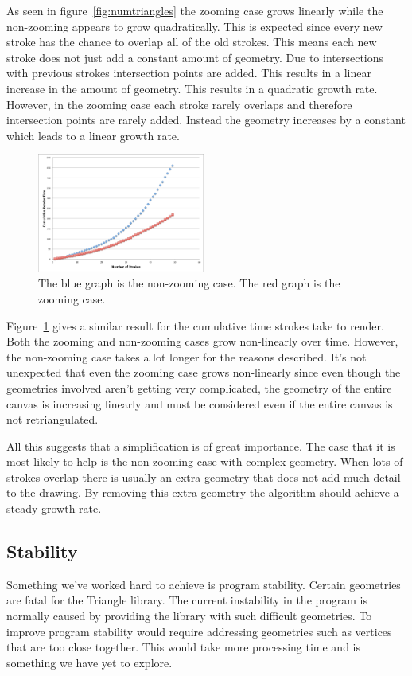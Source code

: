 \documentclass[conference]{acmsiggraph}
\begin{document}
As seen in figure~\ref{fig:numtriangles} the zooming case grows linearly while the non-zooming
appears to grow quadratically. This is expected since every new stroke has the chance to overlap
all of the old strokes. This means each new stroke does not just add a constant amount of geometry.
Due to intersections with previous strokes intersection points are added. This results in a linear
increase in the amount of geometry. This results
in a quadratic growth rate. However, in the zooming case each stroke rarely overlaps and therefore
intersection points are rarely added. Instead the geometry increases by a constant which leads to
a linear growth rate.

\begin{figure}
    \centering
        \includegraphics[width=0.49\textwidth]{graphs/cumulativetime}
    \caption{The blue graph is the non-zooming case. The red graph is the zooming case.}
    \label{fig:timing}
\end{figure}

Figure~\ref{fig:timing} gives a similar result for the cumulative time strokes take to render. Both
the zooming and non-zooming cases grow non-linearly over time. However, the non-zooming case takes
a lot longer for the reasons described. It's not unexpected that even the zooming case grows non-linearly
since even though the geometries involved aren't getting very complicated, the geometry of the entire
canvas is increasing linearly and must be considered even if the entire canvas is not retriangulated.

All this suggests that a simplification is of great importance.
The case that it is most likely to help is the non-zooming case with complex geometry. When lots of strokes
overlap there is usually an extra geometry that does not add much detail to the drawing. By removing
this extra geometry the algorithm should achieve a steady growth rate.

\subsection{Stability}
Something we've worked hard to achieve is program stability. Certain geometries are fatal
for the Triangle library. The current instability in the program is normally caused by
providing the library with such difficult geometries. To improve program stability would
require addressing geometries such as vertices that are too close together. This would
take more processing time and is something we have yet to explore.
\end{document}
